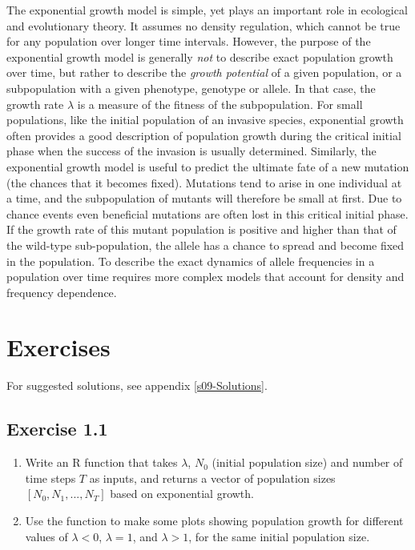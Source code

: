 \documentclass[
]{book}
\begin{document}
The exponential growth model is simple, yet plays an important role in ecological and evolutionary theory. It assumes no density regulation, which cannot be true for any population over longer time intervals. However, the purpose of the exponential growth model is generally \emph{not} to describe exact population growth over time, but rather to describe the \emph{growth potential} of a given population, or a subpopulation with a given phenotype, genotype or allele. In that case, the growth rate \(\lambda\) is a measure of the fitness of the subpopulation. For small populations, like the initial population of an invasive species, exponential growth often provides a good description of population growth during the critical initial phase when the success of the invasion is usually determined. Similarly, the exponential growth model is useful to predict the ultimate fate of a new mutation (the chances that it becomes fixed). Mutations tend to arise in one individual at a time, and the subpopulation of mutants will therefore be small at first. Due to chance events even beneficial mutations are often lost in this critical initial phase. If the growth rate of this mutant population is positive and higher than that of the wild-type sub-population, the allele has a chance to spread and become fixed in the population. To describe the exact dynamics of allele frequencies in a population over time requires more complex models that account for density and frequency dependence.

\hypertarget{exercises}{%
\section{Exercises}\label{exercises}}

For suggested solutions, see appendix \ref{s09-Solutions}.

\hypertarget{exercise-1.1}{%
\subsection*{Exercise 1.1}\label{exercise-1.1}}

\begin{enumerate}
\def\labelenumi{\arabic{enumi}.}
\item
  Write an R function that takes \(\lambda\), \(N_0\) (initial population size) and number of time steps \(T\) as inputs, and returns a vector of population sizes \([N_0, N_1, ..., N_T]\) based on exponential growth.
\item
  Use the function to make some plots showing population growth for different values of \(\lambda<0\), \(\lambda=1\), and \(\lambda>1\), for the same initial population size.
\end{enumerate}
\end{document}
